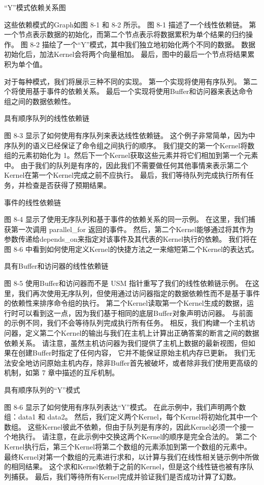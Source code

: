 {\color{red} “Y”模式依赖关系图}

这些依赖模式的Graph如图 8-1 和 8-2 所示。 图 8-1 描述了一个线性依赖链。 
第一个节点表示数据的初始化，而第二个节点表示将数据累积为单个结果的归约操作。 
图 8-2 描绘了一个“Y”模式，其中我们独立地初始化两个不同的数据。 数据初始化后，加法Kernel会将两个向量相加。 
最后，图中的最后一个节点将结果累积为单个值。

对于每种模式，我们将展示三种不同的实现。 第一个实现将使用有序队列。 第二个将使用基于事件的依赖关系。 
最后一个实现将使用Buffer和访问器来表达命令组之间的数据依赖性。

{\color{red} 具有顺序队列的线性依赖链}

图 8-3 显示了如何使用有序队列来表达线性依赖链。 这个例子非常简单，因为中序队列的语义已经保证了命令组之间执行的顺序。 
我们提交的第一个Kernel将数组的元素初始化为 1。然后下一个Kernel获取这些元素并将它们相加到第一个元素中。 
由于我们的队列是有序的，因此我们不需要做任何其他事情来表示第二个Kernel在第一个Kernel完成之前不应执行。 
最后，我们等待队列完成执行所有任务，并检查是否获得了预期结果。

{\color{red} 事件的线性依赖链}

图 8-4 显示了使用无序队列和基于事件的依赖关系的同一示例。 在这里，我们捕获第一次调用 parallel\_for 返回的事件。 
然后，第二个Kernel能够通过将其作为参数传递给depends\_on来指定对该事件及其代表的Kernel执行的依赖。 
我们将在图 8-6 中看到如何使用定义Kernel的快捷方法之一来缩短第二个Kernel的表达式。

{\color{red} 具有Buffer和访问器的线性依赖链}

图 8-5 使用Buffer和访问器而不是 USM 指针重写了我们的线性依赖链示例。 
在这里，我们再次使用无序队列，但使用通过访问器指定的数据依赖性而不是基于事件的依赖性来排序命令组的执行。 
第二个Kernel读取第一个Kernel生成的数据，运行时可以看到这一点，因为我们基于相同的底层Buffer对象声明访问器。 
与前面的示例不同，我们不会等待队列完成执行所有任务。 
相反，我们构建一个主机访问器，定义第二个Kernel的输出与我们在主机上计算出正确答案的断言之间的数据依赖关系。 
请注意，虽然主机访问器为我们提供了主机上数据的最新视图，但如果在创建Buffer时指定了任何内容，
它并不能保证原始主机内存已更新。 
我们无法安全地访问原始主机内存，除非Buffer首先被破坏，或者除非我们使用更高级的机制，如第 7 章中描述的互斥机制。

{\color{red} 具有顺序队列的“Y”模式}

图 8-6 显示了如何使用有序队列表达“Y”模式。 在此示例中，我们声明两个数组：data1 和 data2。 
然后，我们定义两个Kernel，每个Kernel将初始化其中一个数组。 
这些Kernel彼此不依赖，但由于队列是有序的，因此Kernel必须一个接一个地执行。 
请注意，在此示例中交换这两个Kernel的顺序是完全合法的。 
第二个Kernel执行后，第三个Kernel将第二个数组的元素添加到第一个数组的元素中。 
最终Kernel对第一个数组的元素进行求和，以计算与我们在线性相关链示例中所做的相同结果。 
这个求和Kernel依赖于之前的Kernel，但是这个线性链也被有序队列捕获。 
最后，我们等待所有Kernel完成并验证我们是否成功计算了幻数。

